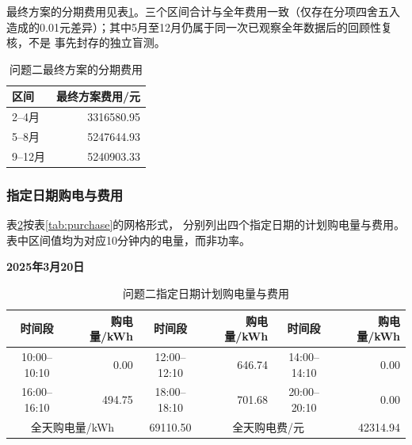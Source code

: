 \documentclass[UTF8,a4paper,12pt]{ctexart}
\begin{document}
最终方案的分期费用见表\ref{tab:q2period}。三个区间合计与全年费用一致（仅存在分项四舍五入
造成的0.01元差异）；其中5月至12月仍属于同一次已观察全年数据后的回顾性复核，不是
事先封存的独立盲测。

\begin{table}[htbp]
 \centering\small
 \caption{问题二最终方案的分期费用}\label{tab:q2period}
 \begin{tabular}{lr}
  \toprule
  区间 & 最终方案费用/元\\
  \midrule
  2--4月 & 3316580.95\\
  5--8月 & 5247644.93\\
  9--12月 & 5240903.33\\
  \bottomrule
 \end{tabular}
\end{table}

\subsubsection{指定日期购电与费用}
表\ref{tab:q2specified1}按表\ref{tab:purchase}的网格形式，
分别列出四个指定日期的计划购电量与费用。
表中区间值均为对应10分钟内的电量，而非功率。

\begin{table}[H]
  \centering\small
  \setlength{\tabcolsep}{4pt}
  \renewcommand{\arraystretch}{0.94}
  \caption{问题二指定日期计划购电量与费用}\label{tab:q2specified1}

  \textbf{2025年3月20日}\\[2pt]
  \begin{tabular}{|c|r|c|r|c|r|}
    \hline
    时间段 & 购电量/kWh & 时间段 & 购电量/kWh & 时间段 & 购电量/kWh\\
    \hline
    10:00--10:10 & 0.00 & 12:00--12:10 & 646.74 & 14:00--14:10 & 0.00\\
    \hline
    16:00--16:10 & 494.75 & 18:00--18:10 & 701.68 & 20:00--20:10 & 0.00\\
    \hline
    \multicolumn{2}{|c|}{全天购电量/kWh} & 69110.50
      & \multicolumn{2}{c|}{全天购电费/元} & 42314.94\\
    \hline
  \end{tabular}

\end{table}
\end{document}
